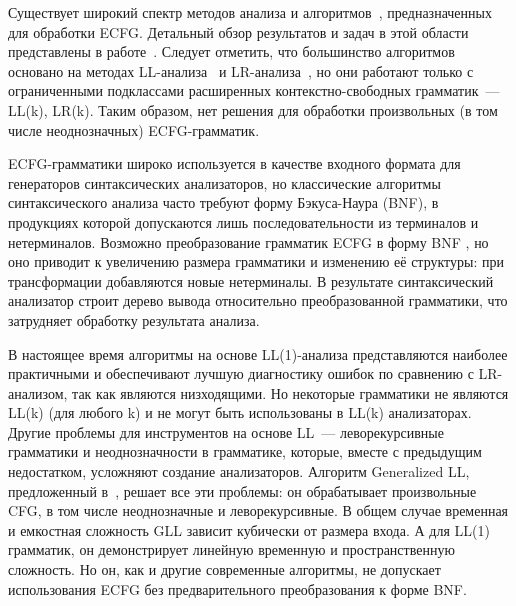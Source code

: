 Существует широкий спектр методов анализа и алгоритмов~\cite{AttributedELL,ELRR,
	ECFGparsing,ELLParser,ELL,ECFG,ELALR,ELRParsing}, предназначенных для обработки
ECFG. Детальный обзор результатов и задач в этой области представлены в работе~\cite{ECFG}.
Следует отметить, что большинство алгоритмов основано на методах
LL-анализа~\cite{ELLParser,AttributedELL,PredictiveECFG} и LR-анализа~\cite{ELRParsing,ELALR,ELRR},
но они работают только с ограниченными подклассами расширенных контекстно-свободных грамматик~---
LL(k), LR(k). Таким образом, нет решения для обработки произвольных (в том числе неоднозначных) ECFG-грамматик.

ECFG-грамматики широко используется в качестве входного формата для генераторов синтаксических анализаторов, 
но классические алгоритмы синтаксического анализа часто требуют форму Бэкуса-Наура (BNF),
в продукциях которой допускаются лишь последовательности из терминалов и нетерминалов.
Возможно преобразование грамматик ECFG в форму BNF \cite{ELL}, но оно приводит к увеличению
размера грамматики и изменению её структуры: при трансформации добавляются новые
нетерминалы. В результате синтаксический анализатор строит дерево вывода относительно
преобразованной грамматики, что затрудняет обработку результата анализа.

В настоящее время алгоритмы на основе LL(1)-анализа представляются
наиболее практичными и обеспечивают лучшую диагностику ошибок по сравнению с LR-анализом, так как являются низходящими. 
Но некоторые грамматики не являются LL(k) (для любого k) и не могут быть использованы в LL(k) анализаторах.
Другие проблемы для инструментов на основе LL~--- леворекурсивные грамматики и неоднозначности в грамматике, 
которые, вместе с предыдущим недостатком, усложняют создание анализаторов. 
Алгоритм Generalized LL, предложенный в~\cite{scott2010gll}, решает 
все эти проблемы: он обрабатывает произвольные CFG, в том числе неоднозначные и леворекурсивные.
В общем случае временная и емкостная сложность GLL зависит кубически от 
размера входа. А для LL(1) грамматик, он демонстрирует линейную временную и
пространственную сложность. Но он, как и другие современные алгоритмы, не допускает использования ECFG 
без предварительного преобразования к форме BNF.

